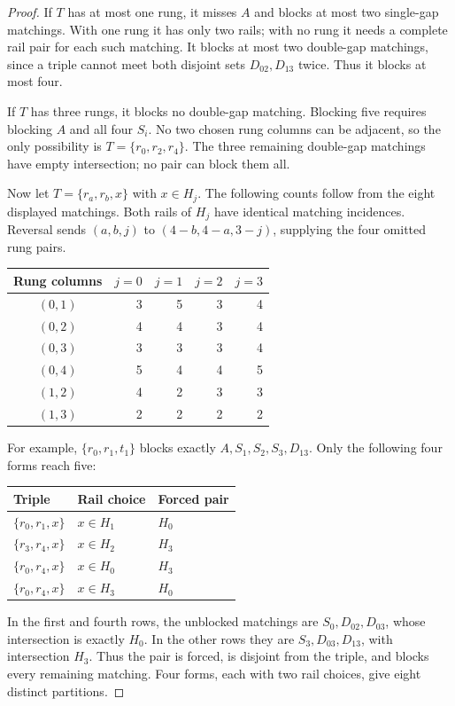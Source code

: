 \documentclass[11pt,letterpaper]{article}
\begin{document}
\begin{proof}
If $T$ has at most one rung, it misses $A$ and blocks at most two
single-gap matchings. With one rung it has only two rails; with no
rung it needs a complete rail pair for each such matching.
It blocks at most two double-gap matchings, since a triple cannot
meet both disjoint sets $D_{02},D_{13}$ twice. Thus it blocks at most four.

If $T$ has three rungs, it blocks no double-gap matching.
Blocking five requires blocking $A$ and all four $S_i$. No two chosen
rung columns can be adjacent, so the only possibility is
$T=\{r_0,r_2,r_4\}$. The three remaining double-gap matchings have
empty intersection; no pair can block them all.

Now let $T=\{r_a,r_b,x\}$ with $x\in H_j$.
The following counts follow from the eight displayed matchings.
Both rails of $H_j$ have identical matching incidences. Reversal sends
$(a,b,j)$ to $(4-b,4-a,3-j)$, supplying the four omitted rung pairs.
\begin{center}\small
\begin{tabular}{crrrr}
\toprule
Rung columns & $j=0$ & $j=1$ & $j=2$ & $j=3$\\
\midrule
$(0,1)$ & 3 & 5 & 3 & 4\\
$(0,2)$ & 4 & 4 & 3 & 4\\
$(0,3)$ & 3 & 3 & 3 & 4\\
$(0,4)$ & 5 & 4 & 4 & 5\\
$(1,2)$ & 4 & 2 & 3 & 3\\
$(1,3)$ & 2 & 2 & 2 & 2\\
\bottomrule
\end{tabular}
\end{center}
For example, $\{r_0,r_1,t_1\}$ blocks exactly
$A,S_1,S_2,S_3,D_{13}$. Only the following four forms reach five:
\begin{center}\small
\begin{tabular}{lll}
\toprule
Triple & Rail choice & Forced pair\\
\midrule
$\{r_0,r_1,x\}$ & $x\in H_1$ & $H_0$\\
$\{r_3,r_4,x\}$ & $x\in H_2$ & $H_3$\\
$\{r_0,r_4,x\}$ & $x\in H_0$ & $H_3$\\
$\{r_0,r_4,x\}$ & $x\in H_3$ & $H_0$\\
\bottomrule
\end{tabular}
\end{center}
In the first and fourth rows, the unblocked matchings are
$S_0,D_{02},D_{03}$, whose intersection is exactly $H_0$.
In the other rows they are $S_3,D_{03},D_{13}$, with intersection $H_3$.
Thus the pair is forced, is disjoint from the triple, and blocks every
remaining matching. Four forms, each with two rail choices, give eight
distinct partitions.


\end{proof}
\end{document}
